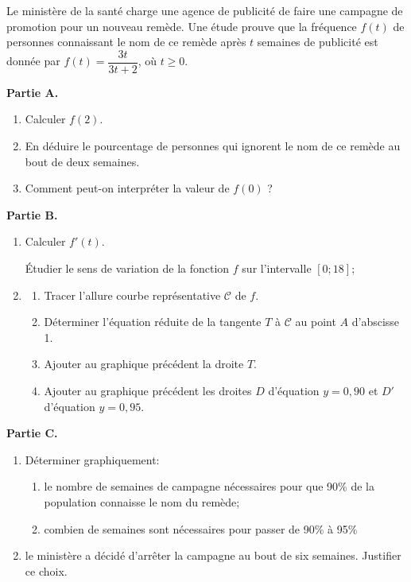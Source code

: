 \documentclass[10pt,a4paper,openany,twoside, eleve]{book}
\begin{document}
\begin{exon}
  Le ministère de la santé charge une agence de publicité de faire
  une campagne de promotion pour un nouveau remède.
  Une étude prouve que la fréquence $f(t)$ de personnes connaissant
  le nom de ce remède après $t$ semaines de publicité est donnée
  par $f(t)=\dfrac{3t}{3t+2}$, où $t\geqslant0$.

  \textbf{Partie A.}
  \begin{enumerate}
    \item Calculer $f(2)$.
    \item En déduire le pourcentage de personnes qui ignorent le nom
          de ce remède au bout de deux semaines.
    \item Comment peut-on interpréter la valeur de $f(0)$ ?
  \end{enumerate}

  \textbf{Partie B.}
  \begin{enumerate}
    \item Calculer $f'(t)$.

          \'Etudier le sens de variation de la fonction $f$ sur
          l'intervalle $[0;18]$;
    \item
          \begin{enumerate}[label=\alph*]
            \item Tracer l'allure courbe représentative $\mathcal{C}$ de $f$.
            \item Déterminer l'équation réduite de la tangente $T$ à $\mathcal{C}$
                  au point $A$ d'abscisse 1.
            \item Ajouter au graphique précédent la droite $T$.
            \item Ajouter au graphique précédent les droites
                  $D$ d'équation $y=0,90$ et $D'$ d'équation $y=0,95$.
          \end{enumerate}
  \end{enumerate}

  \textbf{Partie C.}
  \begin{enumerate}
    \item Déterminer graphiquement:
          \begin{enumerate}[label=\alph*]
            \item le nombre de semaines de campagne nécessaires pour que 90\%
                  de la population connaisse le nom du remède;
            \item combien de semaines sont nécessaires pour passer de 90\%
                  à 95\%
          \end{enumerate}
    \item le ministère a décidé d'arr\^eter la campagne au bout de six semaines.
          Justifier ce choix.
  \end{enumerate}
\end{exon}

\end{document}
